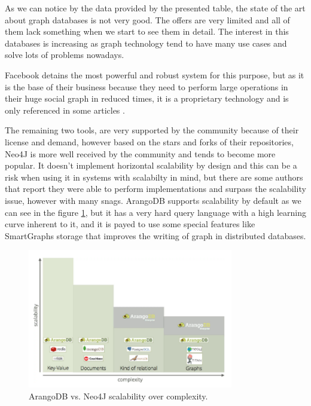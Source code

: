 As we can notice by the data provided by the presented table, the state of the art about graph databases is not very good. The offers are very limited and all of them lack something when we start to see them in detail. The interest in this databases is increasing as graph technology tend to have many use cases and solve lots of problems nowadays.

Facebook detains the most powerful and robust system for this purpose, but as it is the base of their business because they need to perform large operations in their huge social graph in reduced times, it is a proprietary technology and is only referenced in some articles \cite{facebook_tao_article}.

The remaining two tools, are very supported by the community because of their license and demand, however based on the stars and forks of their repositories, Neo4J is more well received by the community and tends to become more popular. It doesn't implement horizontal scalability by design and this can be a risk when using it in systems with scalabilty in mind, but there are some authors that report they were able to perform implementations and surpass the scalability issue, however with many snags\cite{neo4j_scalable}. ArangoDB supports scalability by default as we can see in the figure \ref{fig:arangodb_vs_neo4j_scalability}\cite{arangodb_vs_ne4j}, but it has a very hard query language with a high learning curve inherent to it, and it is payed to use some special features like SmartGraphs storage\cite{arangodb_smart_graphs} that improves the writing of graph in distributed databases.

\begin{figure}[H]
    \centering
    \includegraphics[width=0.80\textwidth]{images/arangodb_vs_neo4j_scalability.pdf}
    \caption{ArangoDB vs. Neo4J scalability over complexity.}
    \label{fig:arangodb_vs_neo4j_scalability}
\end{figure}

